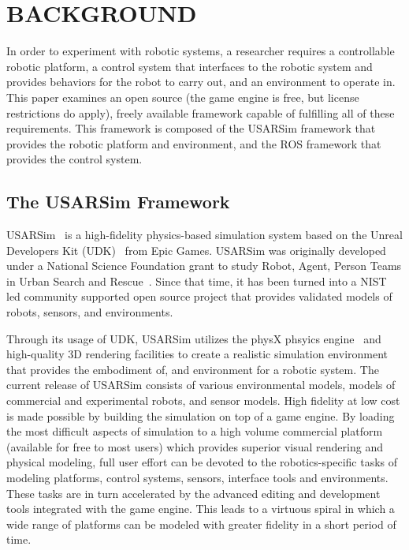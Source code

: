 \section*{BACKGROUND}
In order to experiment with robotic systems, a researcher requires a controllable robotic platform, a control system that interfaces to the robotic system and provides behaviors for the robot to carry out, and an environment to operate in.  This paper examines an open source (the game engine is free, but license restrictions do apply), freely available framework capable of fulfilling all of these requirements. This framework is composed of the USARSim framework that provides the robotic platform and environment, and the ROS framework that provides the control system.

\subsection*{The USARSim Framework}
USARSim~\cite{CARPIN.LNAI.2006,WANG.WSC.2003} is a high-fidelity physics-based simulation system based on the Unreal Developers Kit (UDK)~\cite{UDKWeb} from Epic Games. USARSim was originally developed under a National Science Foundation grant to study Robot, Agent, Person Teams in Urban Search and Rescue~\cite{LEWIS.ICHC.2003}. Since that time, it has been turned into a NIST led community supported open source project that provides validated models of robots, sensors, and environments.


Through its usage of UDK, USARSim utilizes the physX phsyics engine~\cite{physXWeb} and high-quality 3D rendering facilities to create a realistic simulation environment that provides the embodiment of, and environment for a robotic
system. The current release of USARSim consists of various environmental models, models of commercial and experimental robots, and sensor models. High fidelity at low cost is made possible by building the simulation on top of a game engine. By loading the most
difficult aspects of simulation to a high volume commercial platform (available for free to most users) which provides superior visual rendering and physical modeling, full user effort can be devoted to the robotics-specific tasks of modeling platforms, control systems, sensors, interface tools and environments. These tasks are in turn accelerated by the advanced editing and development tools integrated with the game engine. This leads to a virtuous spiral in which a wide range of platforms can be modeled with greater fidelity in a short period of time.

